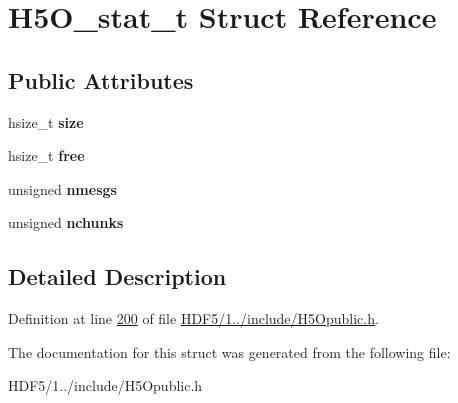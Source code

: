\hypertarget{struct_h5_o__stat__t}{}\section{H5\+O\+\_\+stat\+\_\+t Struct Reference}
\label{struct_h5_o__stat__t}
\subsection*{Public Attributes}
\begin{DoxyCompactItemize}
\item 
\mbox{\label{struct_h5_o__stat__t_a8481e3da9ae558d8f06e2efc238f7651}} 
hsize\+\_\+t {\bfseries size}
\item 
\mbox{\label{struct_h5_o__stat__t_a69bcb51637d339d3fda45c5494318a8d}} 
hsize\+\_\+t {\bfseries free}
\item 
\mbox{\label{struct_h5_o__stat__t_a77127ec21c3808f81d9c51be09b54a17}} 
unsigned {\bfseries nmesgs}
\item 
\mbox{\label{struct_h5_o__stat__t_a9c64b01ceb2c1ced8d70a5f3a1eaaeaf}} 
unsigned {\bfseries nchunks}
\end{DoxyCompactItemize}


\subsection{Detailed Description}


Definition at line \hyperlink{_h_d_f5_21_810_81_2include_2_h5_opublic_8h_source_l00200}{200} of file \hyperlink{_h_d_f5_21_810_81_2include_2_h5_opublic_8h_source}{H\+D\+F5/1../include/\+H5\+Opublic.\+h}.



The documentation for this struct was generated from the following file\+:\begin{DoxyCompactItemize}
\item 
H\+D\+F5/1../include/\+H5\+Opublic.\+h\end{DoxyCompactItemize}
